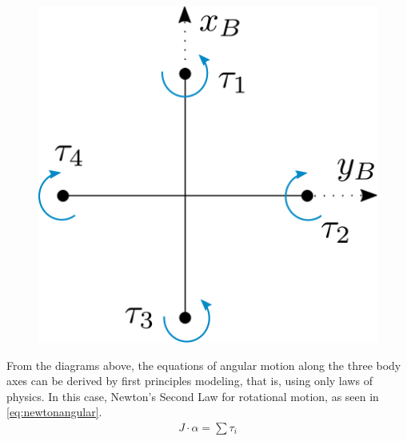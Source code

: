 \begin{minipage}{\linewidth}
\begin{minipage}{0.6\linewidth}
\begin{figure}[H]
			\label{fig:droneDiagram}
		\end{figure}
	\end{minipage}
	\hspace{0.03\linewidth}
	\begin{minipage}{0.35\linewidth}
		\begin{figure}[H] \vspace{20mm}
			\includegraphics[scale=.4]{figures/torquesDiagram}
			\centering
            \vspace{10mm}
			\label{fig:torquesDiagram}
		\end{figure}
	\end{minipage}
\end{minipage}

From the diagrams above, the equations of angular motion along the three body axes can be derived by first principles modeling, that is, using only laws of physics. In this case, Newton's Second Law for rotational motion, as seen in \autoref{eq:newtonangular}.
%
\begin{align}
	J\cdot\alpha=\sum\tau_i
	\label{eq:newtonangular}
\end{align}
\begin{where}
\end{where}


